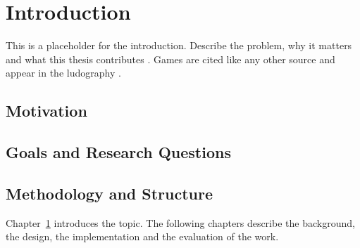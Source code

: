 \chapter{Introduction}
\label{cha:introduction}

This is a placeholder for the introduction. Describe the problem, why it matters and what
this thesis contributes \citep{knuth1984texbook}. Games are cited like any other
source and appear in the ludography \citep{destiny}.

\section{Motivation}

\section{Goals and Research Questions}

\section{Methodology and Structure}
Chapter~\ref{cha:introduction} introduces the topic. The following chapters describe the
background, the design, the implementation and the evaluation of the work.
